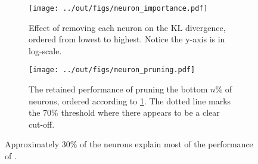 \begin{figure}[t]
    \centering
    \begin{subfigure}[t]{0.43\textwidth}
        \texttt{[image: ../out/figs/neuron\_importance.pdf]}
        \caption{Effect of removing each neuron on the KL divergence, ordered from lowest to highest. Notice the y-axis is in log-scale.}
        \label{fig:neuron-importance}
    \end{subfigure}%
    \hfill
    \begin{subfigure}[t]{0.47\textwidth}
        \texttt{[image: ../out/figs/neuron\_pruning.pdf]}
        \caption{The retained performance of pruning the bottom $n\%$ of neurons, ordered according to \cref{fig:neuron-importance}. The dotted line marks the 70\% threshold where there appears to be a clear cut-off.}
        \label{fig:neuron-pruning}
    \end{subfigure}
    \caption{Approximately 30\% of the neurons explain most of the performance of \ttgpt.}
    \label{fig:neurons}
\end{figure}
